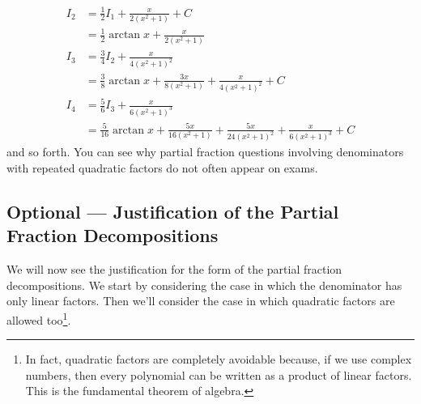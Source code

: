 \begin{eg}
\begin{itemize}
\begin{align*}
  I_2 &= \frac{1}{2} I_1 + \frac{x}{2 (x^2+1)}+C\\
  &= \frac{1}{2}\arctan x + \frac{x}{2(x^2+1)} \\
  I_3 &= \frac{3}{4} I_2 + \frac{x}{4(x^2+1)^2} \\
  &= \frac{3}{8}\arctan x + \frac{3x}{8(x^2+1)} + \frac{x}{4(x^2+1)^2}+C\\
  I_4 &= \frac{5}{6} I_3 + \frac{x}{6(x^2+1)^3} \\
  &= \frac{5}{16}\arctan x + \frac{5x}{16(x^2+1)} + \frac{5x}{24(x^2+1)^2} +
\frac{x}{6(x^2+1)^3}+C
\end{align*}
and so forth. You can see why partial fraction questions involving denominators
with repeated quadratic factors do not often appear on exams.
\end{itemize}

\end{eg}




\subsection{Optional --- Justification of the Partial Fraction Decompositions}
We will now see the justification for the form of the partial fraction decompositions. We start by considering the case in which the denominator 
has only linear factors. Then we'll consider the case in which 
quadratic factors are allowed too\footnote{In fact, quadratic factors are 
completely avoidable because, if we use complex numbers, then every 
polynomial can be written as a product of linear factors. This is the
fundamental theorem of algebra.}.

